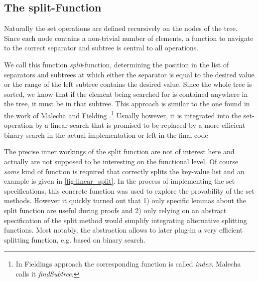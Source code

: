 \subsection{The split-Function}

Naturally the set operations are defined recursively on the nodes of the tree.
Since each node contains a non-trivial number of elements,
a function to navigate to the correct separator and subtree is central to all operations.

We call this function \textit{split}-function,
determining the position in the list of separators and subtrees at which
either the separator is equal to the desired value or the range of the left subtree
contains the desired value.
Since the whole tree is sorted, we know that if the element being searched for
is contained anywhere in the tree, it must be in that subtree.
This approach is similar to the one found in the work of Malecha and Fielding \parencite{DBLP:conf/popl/MalechaMSW10,Fielding80}.\footnote{
    In Fieldings approach the corresponding function is called \textit{index}.
    Malecha calls it \textit{findSubtree}.
}
Usually however, it is integrated into the set-operation
by a linear search that is promised to be replaced by a more efficient binary search
in the actual implementation \parencite{DBLP:books/daglib/0023376,DBLP:journals/acta/BayerM72}
or left in the final code \parencite{DBLP:journals/sosym/ErnstSR15}

The precise inner workings of the split function are not of interest here
and actually are not supposed to be interesting on the functional level.
Of course \textit{some} kind of function is required that correctly splits
the key-value list and an example is given in \autoref{fig:linear_split}.
In the process of implementing the set specifications,
this concrete function was used to explore the provability of the set methods.
However it quickly turned out that 1) only specific lemmas about the split
function are useful during proofs and 2) only relying on an abstract specification of
the split method would simplify integrating alternative splitting functions.
Most notably, the abstraction allows to later plug-in a very efficient splitting
function, e.g. based on binary search.

